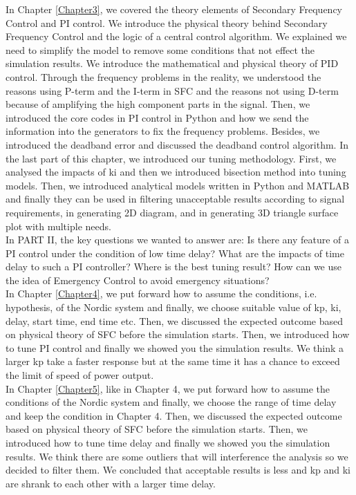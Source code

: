 \documentclass{report}
\begin{document}
In Chapter \textcolor{red}{\ref{Chapter3}}, we covered the theory elements of Secondary Frequency Control and PI control. We introduce the physical theory behind Secondary Frequency Control and the logic of a central control algorithm. We explained we need to simplify the model to remove some conditions that not effect the simulation results. We introduce the mathematical and physical theory of PID control. Through the frequency problems in the reality, we understood the reasons using P-term and the I-term in SFC and the reasons not using D-term because of amplifying the high component parts in the signal. Then, we introduced the core codes in PI control in Python and how we send the information into the generators to fix the frequency problems. Besides, we introduced the deadband error and discussed the deadband control algorithm. In the last part of this chapter, we introduced our tuning methodology. First, we analysed the impacts of ki and then we introduced bisection method into tuning models. Then, we introduced analytical models written in Python and MATLAB and finally they can be used in filtering unacceptable results according to signal requirements, in generating 2D diagram, and in generating 3D triangle surface plot with multiple needs.\\

In PART II, the key questions we wanted to answer are: Is there any feature of a PI control under the condition of low time delay? What are the impacts of time delay to such a PI controller? Where is the best tuning result? How can we use the idea of Emergency Control to avoid emergency situations?\\

In Chapter \textcolor{red}{\ref{Chapter4}}, we put forward how to assume the conditions, i.e. hypothesis, of the Nordic system and finally, we choose suitable value of kp, ki, delay, start time, end time etc. Then, we discussed the expected outcome based on physical theory of SFC before the simulation starts. Then, we introduced how to tune PI control and finally we showed you the simulation results. We think a larger kp take a faster response but at the same time it has a chance to exceed the limit of speed of power output.\\

In Chapter \textcolor{red}{\ref{Chapter5}}, like in Chapter 4, we put forward how to assume the conditions of the Nordic system and finally, we choose the range of time delay and keep the condition in Chapter 4. Then, we discussed the expected outcome based on physical theory of SFC before the simulation starts. Then, we introduced how to tune time delay and finally we showed you the simulation results. We think there are some outliers that will interference the analysis so we decided to filter them. We concluded that acceptable results is less and kp and ki are shrank to each other with a larger time delay.\\
\end{document}
